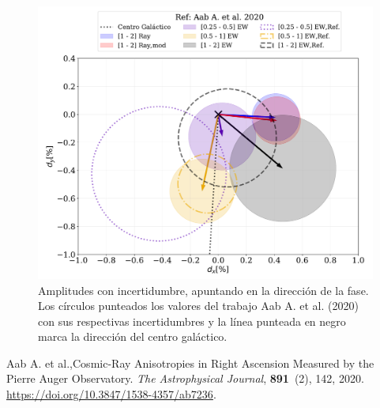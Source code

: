 \documentclass[11pt, letterpaper,oneside]{article}
\begin{document}
\begin{figure}[H]
    \begin{small}
        \begin{center}
            
            \includegraphics[width=\textwidth]{Figs/comparando_sigmas_v4.pdf}
            \vspace*{-1. cm}
        \end{center}
        \caption{Amplitudes con incertidumbre, apuntando en la dirección  de la fase. Los círculos punteados los valores del trabajo Aab A. et al. (2020) \cite{Aab_2020} con sus respectivas incertidumbres y la línea punteada en negro marca la dirección del centro galáctico.}
        \label{fig:incertidumbre}
    \end{small}
\end{figure}

\begin{thebibliography}{9}
    {Aab A. et al.},{Cosmic-Ray Anisotropies in Right Ascension Measured by the {Pierre   Auger Observatory}}.
    \emph{The Astrophysical Journal}, \textbf{891}~(2), 142, 2020. \url{https://doi.org/10.3847/1538-4357/ab7236}.
\end{thebibliography}
    
\end{document}
